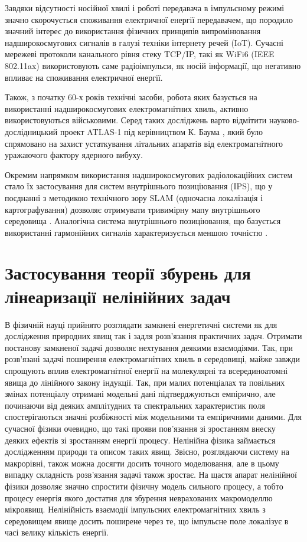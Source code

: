 Завдяки відсутності носійної хвилі і роботі передавача в імпульсному режимі 
значно скорочується споживання електричної енергії передавачем, що породило 
значний інтерес до використання фізичних принципів випромінювання 
надширокосмугових сигналів в галузі техніки інтернету речей (IoT). 
Сучасні мережеві протоколи канального рівня стеку TCP/IP, такі як WiFi6 
(IEEE 802.11ax) \cite{imp:Khorov2019} використовують саме радіоімпульси,
як носій інформації, що негативно впливає на споживання електричної енергії.

Також, з початку 60-х років технічні засоби, робота яких базується на 
використанні надширокосмугових електромагнітних хвиль, активно 
використовуються військовими. Серед таких досліджень варто відмітити 
науково-дослідницький проект ATLAS-1 під керівництвом К. Баума 
\cite{imp:BaumSSN0267}, який було спрямовано на захист устаткування 
літальних апаратів від електромагнітного уражаючого фактору ядерного 
вибуху.

Окремим напрямком використання надширокосмугових радіолокаційних систем 
стало їх застосування для систем внутрішнього позиціювання (IPS), що у 
поєднанні з методикою технічного зору SLAM (одночасна локалізація і 
картографування) дозволяє отримувати тривимірну мапу внутрішнього 
середовища \cite{imp:Segura2011}. Аналогічна система внутрішнього 
позиціювання, що базується використанні гармонійних сигналів 
характеризується меншою точністю \cite{imp:Zou2017}.

\section{Застосування теорії збурень для лінеаризації нелінійних задач}

В фізичній науці прийнято розглядати замкнені енергетичні системи як для 
дослідження природних явищ так і задля розв'язання практичних задач. 
Отримати постанову замкненої задачі дозволяє нехтування деякими взаємодіями. 
Так, при розв'язані задачі поширення електромагнітних хвиль в середовищі, 
майже завжди спрощують вплив електромагнітної енергії на молекулярні та
всерединоатомні явища до лінійного закону індукції. Так, при малих потенціалах 
та повільних змінах потенціалу отримані модельні дані підтверджуються 
емпірично, але починаючи від деяких амплітудних та спектральних характеристик 
поля спостерігаються значні розбіжності між модельними та емпіричними 
даними. Для сучасної фізики очевидно, що такі прояви пов'язання зі 
зростанням внеску деяких ефектів зі зростанням енергії процесу. Нелінійна 
фізика займається дослідженням природи та описом таких явищ. Звісно, 
розглядаючи систему на макрорівні, також можна досягти досить точного 
моделювання, але в цьому випадку складність розв'язання задачі також 
зростає. На щастя апарат нелінійної фізики дозволяє значно спростити 
фізичну модель сильного процесу, а тобто процесу енергія якого достатня 
для збурення неврахованих макромоделлю мікроявищ. Нелінійність взаємодії
імпульсних електромагнітних хвиль з середовищем явище досить 
поширене через те, що імпульсне поле локалізує в  часі велику кількість 
енергії.

